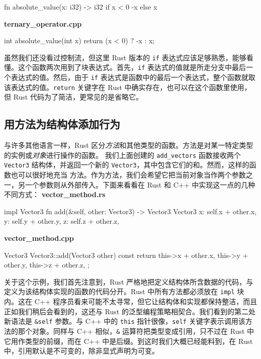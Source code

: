 \begin{codebox}[rust]
fn absolute_value(x: i32) -> i32 {
    if x < 0 { -x } else { x }
}
\end{codebox}
\textbf{ternary\_\allowbreak{}operator.\allowbreak{}cpp}
\begin{codebox}[text]
int absolute_value(int x) {
    return (x < 0) ? -x : x;
}
\end{codebox}
\label{idx:idx_d7c7d45a}
\label{idx:idx_d95a7a94}
虽然我们还没看过控制流，但这里 Rust 版本的 \texttt{if} 表达式应该足够熟悉，能够看懂。这个函数两次用到了块表达式。首先，\texttt{if} 表达式的值就是所走分支中最后一个表达式的值。然后，由于 \texttt{if} 表达式是函数中的最后一个表达式，整个函数就取该表达式的值。\texttt{return} 关键字在 Rust 中确实存在，也可以在这个函数里使用，但 Rust 代码为了简洁，更常见的是省略它。
\subsection{用方法为结构体添加行为}
\label{idx:idx_77c6c80a}
与许多其他语言一样，Rust 区分\emph{方法}和其他类型的函数。方法是对某一特定类型的实例或\emph{对象}进行操作的函数。
\label{idx:idx_bc19f485}
我们上面创建的 \texttt{add\_\allowbreak{}vectors} 函数接收两个 \texttt{Vector3} 结构体，并返回一个新的
\texttt{Vector3}，其中包含它们的和。然而，这样的函数也可以很好地充当
方法。作为方法，我们会希望它把当前对象当作两个参数之一，另一个参数则从外部传入。下面来看看在 Rust 和 C++ 中实现这一点的几种不同方式：
\textbf{vector\_\allowbreak{}method.\allowbreak{}rs}
\begin{codebox}[rust]
impl Vector3 {
    fn add(&self, other: Vector3) -> Vector3 {
        Vector3 {
            x: self.x + other.x,
            y: self.y + other.y,
            z: self.z + other.z,
        }
    }
}
\end{codebox}
\textbf{vector\_\allowbreak{}method.\allowbreak{}cpp}
\begin{codebox}[rust]
Vector3 Vector3::add(Vector3 other) const {
    return {
        this->x + other.x,
        this->y + other.y,
        this->z + other.z,
    };
}
\end{codebox}
\label{idx:idx_05655144}
关于这个示例，我们首先注意到，Rust 严格地把定义结构体所含数据的代码，与定义为该结构体实现的函数的代码分开。Rust 中所有方法都必须放在 \texttt{impl} 块内。这在 C++ 程序员看来可能不太寻常，但它让结构体和实现都保持整洁，而且正如我们稍后会看到的，这还与 Rust 的泛型编程策略相契合。我们看到的第二处新语法是 \texttt{\&self} 参数。与 C++ 中的 \texttt{this} 指针很像，\texttt{self} 关键字表示调用该方法的那个对象。同样与 C++ 相似，\texttt{\&} 运算符把类型变成引用，只不过在 Rust 中它用作类型的前缀，而在 C++ 中是后缀。到这时我们大概已经能料到，在 Rust 中，引用默认是不可变的，除非显式声明为可变。
